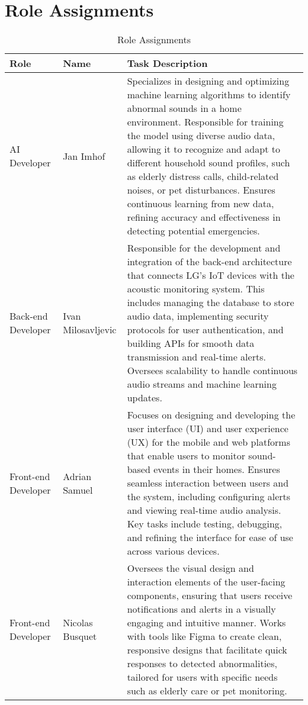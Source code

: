 \documentclass[conference]{IEEEtran}
\begin{document}
\section{Role Assignments}
\begin{table}[H]
    \centering
    \caption{Role Assignments}
    \begin{adjustbox}{max width=\textwidth}
        \begin{tabular}{|>{\centering\arraybackslash}m{1.2cm}|>{\centering\arraybackslash}m{1.6cm}|m{4.8cm}|}
        \hline
        \textbf{Role} & \textbf{Name} & \textbf{Task Description} \\
        \hline
        AI Developer & Jan Imhof & Specializes in designing and optimizing machine learning algorithms to identify abnormal sounds in a home environment. Responsible for training the model using diverse audio data, allowing it to recognize and adapt to different household sound profiles, such as elderly distress calls, child-related noises, or pet disturbances. Ensures continuous learning from new data, refining accuracy and effectiveness in detecting potential emergencies. \\
        \hline
        Back-end Developer & Ivan Milosavljevic & Responsible for the development and integration of the back-end architecture that connects LG’s IoT devices with the acoustic monitoring system. This includes managing the database to store audio data, implementing security protocols for user authentication, and building APIs for smooth data transmission and real-time alerts. Oversees scalability to handle continuous audio streams and machine learning updates. \\
        \hline
        Front-end Developer & Adrian Samuel & Focuses on designing and developing the user interface (UI) and user experience (UX) for the mobile and web platforms that enable users to monitor sound-based events in their homes. Ensures seamless interaction between users and the system, including configuring alerts and viewing real-time audio analysis. Key tasks include testing, debugging, and refining the interface for ease of use across various devices. \\
        \hline
        Front-end Developer & Nicolas Busquet & Oversees the visual design and interaction elements of the user-facing components, ensuring that users receive notifications and alerts in a visually engaging and intuitive manner. Works with tools like Figma to create clean, responsive designs that facilitate quick responses to detected abnormalities, tailored for users with specific needs such as elderly care or pet monitoring. \\
        \hline
    \end{tabular}
    \end{adjustbox}
\end{table}
\end{document}
